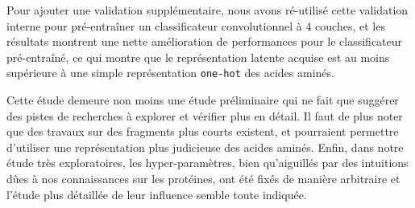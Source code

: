 \documentclass[a4paper, 11pt, onecolumn]{article}
\begin{document}
Pour ajouter une validation supplémentaire, nous avons ré-utilisé cette
validation interne pour pré-entraîner un classificateur convolutionnel à 4
couches, et les résultats montrent une nette amélioration de performances pour
le classificateur pré-entraîné, ce qui montre que le représentation latente
acquise est au moins supérieure à une simple représentation \texttt{one-hot} des
acides aminés.

Cette étude demeure non moins une étude préliminaire qui ne fait que suggérer
des pistes de recherches à explorer et vérifier plus en détail. Il faut de plus
noter que des travaux sur des fragments plus courts existent, et pourraient
permettre d'utiliser une représentation plus judicieuse des acides aminés.
Enfin, dans notre étude très exploratoires, les hyper-paramètres, bien
qu'aiguillés par des intuitions dûes à nos connaissances sur les protéines, ont
été fixés de manière arbitraire et l'étude plus détaillée de leur influence semble toute indiquée.


\newpage

\printbibliography
\end{document}
